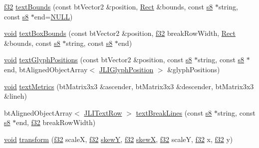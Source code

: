 \begin{DoxyCompactItemize}
\item 
\mbox{\hyperlink{_util_8h_a5f6906312a689f27d70e9d086649d3fd}{f32}} \mbox{\hyperlink{classnjli_1_1_world_h_u_d_a1e5d4bd2375c309bd3d0450ae2cd6781}{text\+Bounds}} (const bt\+Vector2 \&position, \mbox{\hyperlink{classnjli_1_1_rect}{Rect}} \&bounds, const \mbox{\hyperlink{_util_8h_a2ff401e087cf786c38a6812723e94473}{s8}} $\ast$string, const \mbox{\hyperlink{_util_8h_a2ff401e087cf786c38a6812723e94473}{s8}} $\ast$end=\mbox{\hyperlink{_util_8h_a070d2ce7b6bb7e5c05602aa8c308d0c4}{N\+U\+LL}})
\item 
\mbox{\hyperlink{_thread_8h_af1e856da2e658414cb2456cb6f7ebc66}{void}} \mbox{\hyperlink{classnjli_1_1_world_h_u_d_a5f0b515da70d4597cb5ee69b9ccd4783}{text\+Box\+Bounds}} (const bt\+Vector2 \&position, \mbox{\hyperlink{_util_8h_a5f6906312a689f27d70e9d086649d3fd}{f32}} break\+Row\+Width, \mbox{\hyperlink{classnjli_1_1_rect}{Rect}} \&bounds, const \mbox{\hyperlink{_util_8h_a2ff401e087cf786c38a6812723e94473}{s8}} $\ast$string, const \mbox{\hyperlink{_util_8h_a2ff401e087cf786c38a6812723e94473}{s8}} $\ast$end)
\item 
\mbox{\hyperlink{_thread_8h_af1e856da2e658414cb2456cb6f7ebc66}{void}} \mbox{\hyperlink{classnjli_1_1_world_h_u_d_a2c3d54d2d74dcf511031a7dfbb0e05ec}{text\+Glyph\+Positions}} (const bt\+Vector2 \&position, const \mbox{\hyperlink{_util_8h_a2ff401e087cf786c38a6812723e94473}{s8}} $\ast$string, const \mbox{\hyperlink{_util_8h_a2ff401e087cf786c38a6812723e94473}{s8}} $\ast$end, bt\+Aligned\+Object\+Array$<$ \mbox{\hyperlink{structnjli_1_1_j_l_i_glyph_position}{J\+L\+I\+Glyph\+Position}} $>$ \&glyph\+Positions)
\item 
\mbox{\hyperlink{_thread_8h_af1e856da2e658414cb2456cb6f7ebc66}{void}} \mbox{\hyperlink{classnjli_1_1_world_h_u_d_a1c2fe58e99ad361f25745a1a7abfb1aa}{text\+Metrics}} (bt\+Matrix3x3 \&ascender, bt\+Matrix3x3 \&descender, bt\+Matrix3x3 \&lineh)
\item 
bt\+Aligned\+Object\+Array$<$ \mbox{\hyperlink{structnjli_1_1_j_l_i_text_row}{J\+L\+I\+Text\+Row}} $>$ \mbox{\hyperlink{classnjli_1_1_world_h_u_d_a1546740cf3833b9f121451af58261bc4}{text\+Break\+Lines}} (const \mbox{\hyperlink{_util_8h_a2ff401e087cf786c38a6812723e94473}{s8}} $\ast$string, const \mbox{\hyperlink{_util_8h_a2ff401e087cf786c38a6812723e94473}{s8}} $\ast$end, \mbox{\hyperlink{_util_8h_a5f6906312a689f27d70e9d086649d3fd}{f32}} break\+Row\+Width)
\item 
\mbox{\hyperlink{_thread_8h_af1e856da2e658414cb2456cb6f7ebc66}{void}} \mbox{\hyperlink{classnjli_1_1_world_h_u_d_abf39159728f0defe021310b5ee195388}{transform}} (\mbox{\hyperlink{_util_8h_a5f6906312a689f27d70e9d086649d3fd}{f32}} scaleX, \mbox{\hyperlink{_util_8h_a5f6906312a689f27d70e9d086649d3fd}{f32}} \mbox{\hyperlink{classnjli_1_1_world_h_u_d_ac354c68e141696172bd0b1fc07d89f28}{skewY}}, \mbox{\hyperlink{_util_8h_a5f6906312a689f27d70e9d086649d3fd}{f32}} \mbox{\hyperlink{classnjli_1_1_world_h_u_d_ab0a05d76b5251719b228fed812d69ff7}{skewX}}, \mbox{\hyperlink{_util_8h_a5f6906312a689f27d70e9d086649d3fd}{f32}} scaleY, \mbox{\hyperlink{_util_8h_a5f6906312a689f27d70e9d086649d3fd}{f32}} x, \mbox{\hyperlink{_util_8h_a5f6906312a689f27d70e9d086649d3fd}{f32}} y)

\end{DoxyCompactItemize}
